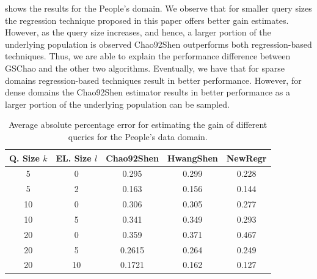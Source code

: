  shows the results for the People's domain. We observe that for smaller query sizes the regression technique proposed in this paper offers better gain estimates. However, as the query size increases, and hence, a larger portion of the underlying population is observed Chao92Shen outperforms both regression-based techniques. Thus, we are able to explain the performance difference between GSChao and the other two algorithms. Eventually, we have that for sparse domains regression-based techniques result in better performance. However, for dense domains the Chao92Shen estimator results in better performance as a larger portion of the underlying population can be sampled. 

\begin{table}[h]
\small \center
\caption{Average absolute percentage error for estimating the gain of different queries for the People's data domain.}
\label{tab:peopleesterror}
\begin{tabular}{|c|c|c|c|c|}
\hline
\textbf{Q. Size $k$} & \textbf{EL. Size $l$} & \textbf{Chao92Shen} & \textbf{HwangShen} & \textbf{NewRegr} \\ \hline
5 & 0 & 0.295 & 0.299 & 0.228\\
5 & 2 & 0.163 &  0.156 & 0.144\\
10 & 0 &  0.306 & 0.305 & 0.277\\
10 & 5 &  0.341 & 0.349 & 0.293\\
20 & 0 &  0.359& 0.371 & 0.467 \\
20 & 5 &  0.2615 & 0.264 & 0.249\\
20 & 10 & 0.1721 & 0.162 & 0.127\\
\hline
\end{tabular}
\end{table}


